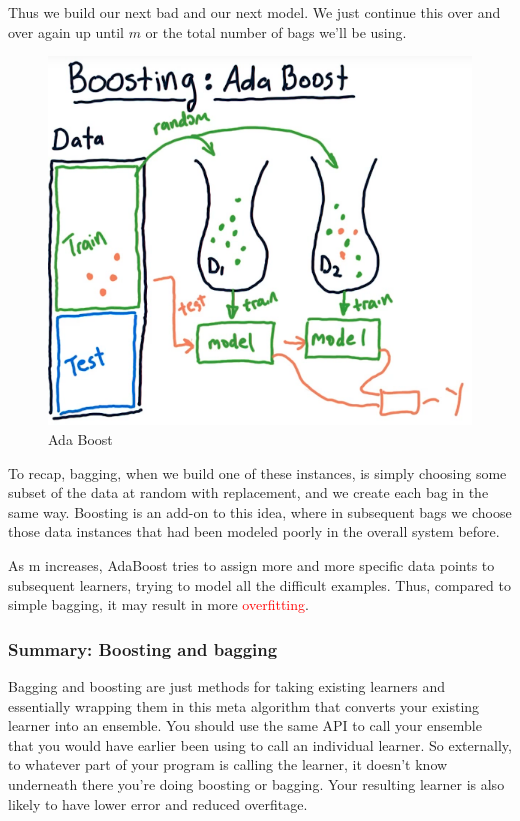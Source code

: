 \documentclass[12pt]{article}
\begin{document}
Thus we build our next bad and our next model. We just continue this over and over again up until $m$ or the total number of bags we'll be using. 

\begin{figure}[!ht]
\centering
\includegraphics[scale=0.45]{fig/fig96}
\caption{Ada Boost}
\end{figure}

To recap, bagging, when we build one of these instances, is simply choosing some subset of the data at random with replacement, and we create each bag in the same way. Boosting is an add-on to this idea, where in subsequent bags we choose those data instances that had been modeled poorly in the overall system before. 

As m increases, AdaBoost tries to assign more and more specific data points to subsequent learners, trying to model all the difficult examples. Thus, compared to simple bagging, it may result in more \textcolor{red}{overfitting}.

\subsubsection{Summary: Boosting and bagging}

Bagging and boosting are just methods for taking existing learners and essentially wrapping them in this meta algorithm that converts your existing learner into an ensemble. You should use the same API to call your ensemble that you would have earlier been using to call an individual learner. So externally, to whatever part of your program is calling the learner, it doesn't know underneath there you're doing boosting or bagging. Your resulting learner is also likely to have lower error and reduced overfitage. 
\end{document}
